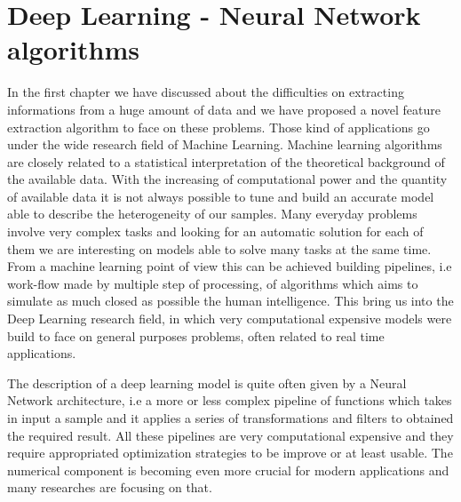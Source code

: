 \documentclass{standalone}
\begin{document}
\chapter[Deep Learning]{Deep Learning - Neural Network algorithms}\label{chapter2:neural}

In the first chapter we have discussed about the difficulties on extracting informations from a huge amount of data and we have proposed a novel feature extraction algorithm to face on these problems.
Those kind of applications go under the wide research field of Machine Learning.
Machine learning algorithms are closely related to a statistical interpretation of the theoretical background of the available data.
With the increasing of computational power and the quantity of available data it is not always possible to tune and build an accurate model able to describe the heterogeneity of our samples.
Many everyday problems involve very complex tasks and looking for an automatic solution for each of them we are interesting on models able to solve many tasks at the same time.
From a machine learning point of view this can be achieved building pipelines, i.e work-flow made by multiple step of processing, of algorithms which aims to simulate as much closed as possible the human intelligence.
This bring us into the Deep Learning research field, in which very computational expensive models were build to face on general purposes problems, often related to real time applications.

The description of a deep learning model is quite often given by a Neural Network architecture, i.e a more or less complex pipeline of functions which takes in input a sample and it applies a series of transformations and filters to obtained the required result.
All these pipelines are very computational expensive and they require appropriated optimization strategies to be improve or at least usable.
The numerical component is becoming even more crucial for modern applications and many researches are focusing on that.
\end{document}
